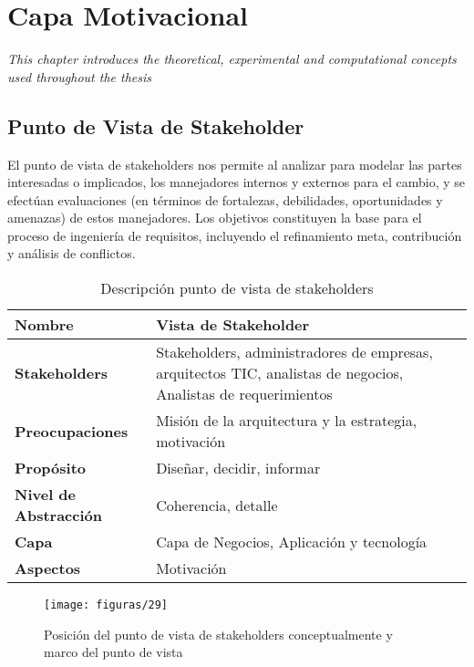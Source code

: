 \chapter{Capa Motivacional}
\label{chap:Motivacional}
\textit{This chapter introduces the theoretical, experimental and computational concepts used throughout the thesis}
\vspace{2ex}\vfill
\minitoc
\newpage

\section{Punto de Vista de Stakeholder}
El punto de vista de stakeholders nos permite al analizar para modelar las partes interesadas o implicados, los manejadores internos y externos para el cambio, y se efectúan evaluaciones (en términos de fortalezas, debilidades, oportunidades y amenazas) de estos manejadores. Los objetivos constituyen la base para el proceso de ingeniería de requisitos, incluyendo el refinamiento meta, contribución y análisis de conflictos.
    
  \begin{table}[H]
  	\centering
   	\begin{tabular}{p{3.7cm}p{8cm}}
   		\hline
   		\rowcolor[HTML]{0073a1}
   		{\color[HTML]{FFFFFF} \textbf{Nombre}} & {\color[HTML]{FFFFFF} \textbf{Vista de Stakeholder}} \\
   		\hline
   		\textbf{Stakeholders} & Stakeholders, administradores de empresas, arquitectos TIC, analistas de negocios, Analistas de requerimientos \\
   		\textbf{Preocupaciones} & Misión de la arquitectura y la estrategia, motivación \\
   		\textbf{Propósito} & Diseñar, decidir, informar \\
   		\textbf{Nivel de Abstracción} & Coherencia, detalle \\
   		\textbf{Capa} & Capa de Negocios, Aplicación y tecnología \\
   		\textbf{Aspectos} & Motivación \\
   		\bottomrule
   	\end{tabular}
   	\captionsetup{width=.95\textwidth}
   	\caption{Descripción punto de vista de stakeholders}
   	\label{tabla20}
  \end{table}
    
  \begin{figure}[H]
   	\centering
   	\texttt{[image: figuras/29]}
   	\captionsetup{width=.95\textwidth}
   	\caption{Posición del punto de vista de stakeholders conceptualmente y marco del punto de vista}
   	\label{figura29}
   \end{figure}
   
